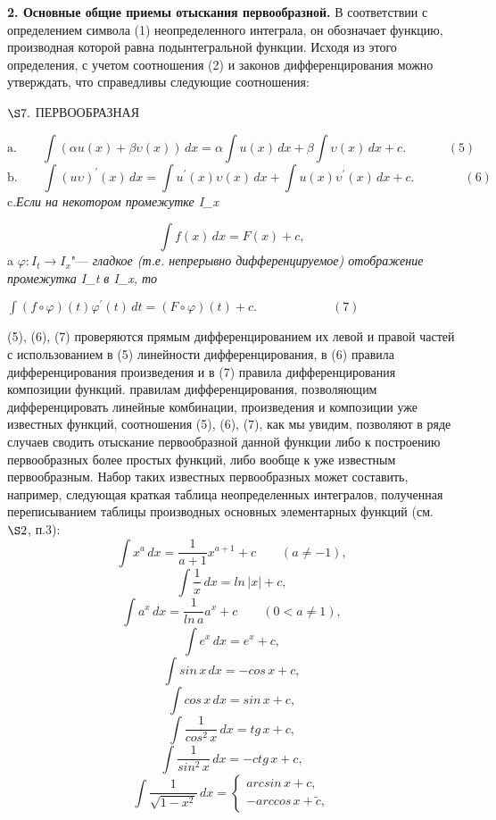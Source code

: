 \documentclass[a5paper, 16pt]{book}
\begin{document}
    \par\textbf{2. Основные общие приемы отыскания первообразной.} В соответствии с определением символа (1) неопределенного интеграла, он обозначает функцию, производная которой равна подынтегральной функции. Исходя из этого определения, с учетом соотношения (2) и законов дифференцирования можно утверждать, что справедливы следующие соотношения:

    \newpage

    \begin{center}
        $\S7.$ \textsc{ПЕРВООБРАЗНАЯ}
    \end{center}
    \begin{flushleft}
        $$\textrm{a.} \qquad \int (\alpha u(x) + \beta \upsilon (x)) \, dx = \alpha \int u(x) \, dx + \beta \int \upsilon (x) \, dx + c. \quad \qquad \, \,(5)$$
        $$\textrm{b.} \qquad \int (u \upsilon) ^ {'} (x) \, dx = \int u ^ {'} (x) \upsilon (x) \, dx + \int u(x) \upsilon ^ {'} (x) \, dx + c. \quad \qquad \quad (6)$$
        \quad \textrm{c.}\textit{Если на некотором промежутке I_x}
    \end{flushleft}
    $$\int f(x) \, dx = F(x) +c,$$
    a $\varphi : I_t \to I_x \textbf{"---}$ \textit{гладкое (т.е. непрерывно дифференцируемое) отображение промежутка I_t в I_x, то}
    \begin{flushright}
    $\int (f \circ \varphi)(t) \varphi ^ {'} (t) \, dt = (F \circ \varphi)(t) + c. \qquad \qquad \qquad (7)$
    \end{flushright}
     (5), (6), (7) проверяются прямым дифференцированием их левой и правой частей с использованием в (5) линейности дифференцирования, в (6) правила дифференцирования произведения и в (7) правила дифференцирования композиции функций.
     правилам дифференцирования, позволяющим дифференцировать линейные комбинации, произведения и композиции уже известных функций, соотношения (5), (6), (7), как мы увидим, позволяют в ряде случаев сводить отыскание первообразной данной функции либо к построению первообразных более простых функций, либо вообще к уже известным первообразным. Набор таких известных первообразных может составить, например, следующая краткая таблица неопределенных интегралов, полученная переписыванием таблицы производных основных элементарных функций (см. $\S2$, п.3):
    $$\int x ^ {a} \, dx = \frac{1}{a + 1} x ^ {a + 1} + c \qquad (a \neq -1),$$
    $$\int \frac{1}{x} \, dx = ln \, |x| + c,$$
    $$\int a ^ {x} \, dx = \frac{1}{ln \, a} a ^ {x} + c \qquad (0 < a \neq 1),$$
    $$\int e ^ {x} \, dx = e ^ {x} + c,$$
    $$\int sin \, x \, dx = -cos \, x +c,$$
    $$\int cos \, x \, dx = sin \, x + c,$$
    $$\int \frac{1}{cos ^ {2} \, x} \, dx = tg \, x + c,$$
    $$\int \frac{1}{sin ^ {2} \, x} \, dx = -ctg \, x + c,$$
    \begin{equation*}
        \int \frac{1}{\sqrt{1 - x ^ {2}}} \, dx =
        \begin{cases}
            arcsin \, x +c, \\
            -arccos \, x + \tilde c,
        \end{cases}
    \end{equation*}
    
\end{document}
